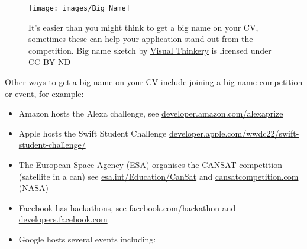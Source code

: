 \documentclass[
]{book}
\providecommand{\tightlist}{%
  \setlength{\itemsep}{0pt}\setlength{\parskip}{0pt}}
\begin{document}
\begin{figure}

{\centering \texttt{[image: images/Big Name]} 

}

\caption{It's easier than you might think to get a big name on your CV, sometimes these can help your application stand out from the competition. Big name sketch by \href{https://visualthinkery.com}{Visual Thinkery} is licensed under \href{https://creativecommons.org/licenses/by-nd/4.0/}{CC-BY-ND}}\label{fig:bigname-fig}
\end{figure}



Other ways to get a big name on your CV include joining a big name competition or event, for example:

\begin{itemize}
\tightlist
\item
  Amazon hosts the Alexa challenge, see \href{https://developer.amazon.com/alexaprize/challenges/current-challenge/rules}{developer.amazon.com/alexaprize}
\item
  Apple hosts the Swift Student Challenge \href{https://developer.apple.com/wwdc22/swift-student-challenge/}{developer.apple.com/wwdc22/swift-student-challenge/}
\item
  The European Space Agency (ESA) organises the CANSAT competition (satellite in a can) see \href{https://www.esa.int/Education/CanSat}{esa.int/Education/CanSat} and \href{http://www.cansatcompetition.com/}{cansatcompetition.com} (NASA)
\item
  Facebook has hackathons, see \href{https://en-gb.facebook.com/hackathon}{facebook.com/hackathon} and \href{https://developers.facebook.com/}{developers.facebook.com}
\item
  Google hosts several events including:


\end{itemize}
\end{document}
